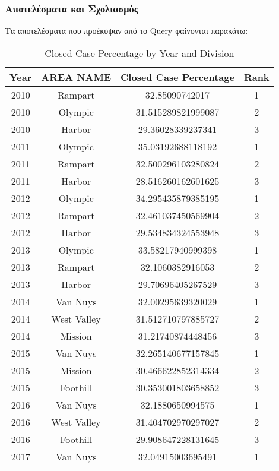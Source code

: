 \documentclass{article}
\begin{document}
\subsubsection*{Αποτελέσματα και Σχολιασμός}
Τα αποτελέσματα που προέκυψαν από το Query φαίνονται παρακάτω: \\
\begin{table}[h!]
\centering
\caption{Closed Case Percentage by Year and Division}
\label{tab:closed_case_percentage}
\begin{tabular}{|c|c|c|c|}
\hline
\textbf{Year} & \textbf{AREA NAME} & \textbf{Closed Case Percentage} & \textbf{Rank} \\ \hline
2010 & Rampart & 32.85090742017 & 1 \\ \hline
2010 & Olympic & 31.515289821999087 & 2 \\ \hline
2010 & Harbor & 29.36028339237341 & 3 \\ \hline
2011 & Olympic & 35.03192688118192 & 1 \\ \hline
2011 & Rampart & 32.500296103280824 & 2 \\ \hline
2011 & Harbor & 28.516260162601625 & 3 \\ \hline
2012 & Olympic & 34.295435879385195 & 1 \\ \hline
2012 & Rampart & 32.461037450569904 & 2 \\ \hline
2012 & Harbor & 29.534834324553948 & 3 \\ \hline
2013 & Olympic & 33.58217940999398 & 1 \\ \hline
2013 & Rampart & 32.1060382916053 & 2 \\ \hline
2013 & Harbor & 29.70696405267529 & 3 \\ \hline
2014 & Van Nuys & 32.00295639320029 & 1 \\ \hline
2014 & West Valley & 31.512710797885727 & 2 \\ \hline
2014 & Mission & 31.21740874448456 & 3 \\ \hline
2015 & Van Nuys & 32.265140677157845 & 1 \\ \hline
2015 & Mission & 30.466622852314334 & 2 \\ \hline
2015 & Foothill & 30.353001803658852 & 3 \\ \hline
2016 & Van Nuys & 32.1880650994575 & 1 \\ \hline
2016 & West Valley & 31.404702970297027 & 2 \\ \hline
2016 & Foothill & 29.908647228131645 & 3 \\ \hline
2017 & Van Nuys & 32.04915003695491 & 1 \\ \hline

\end{tabular}
\end{table}
\end{document}
